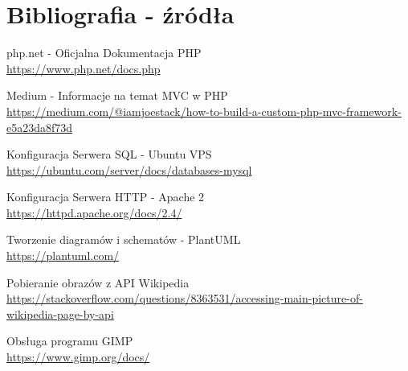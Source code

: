 
\section{Bibliografia - źródła }

\begin{thebibliography}{9}
    php.net - Oficjalna Dokumentacja PHP\\
    \url{https://www.php.net/docs.php}

    Medium - Informacje na temat MVC w PHP\\
    \url{https://medium.com/@iamjoestack/how-to-build-a-custom-php-mvc-framework-e5a23da8f73d}

    Konfiguracja Serwera SQL - Ubuntu VPS\\
    \url{https://ubuntu.com/server/docs/databases-mysql}


    Konfiguracja Serwera HTTP -  Apache 2\\
    \url{https://httpd.apache.org/docs/2.4/}

    Tworzenie diagramów i schematów - PlantUML\\
    \url{https://plantuml.com/}


    Pobieranie obrazów z API Wikipedia\\
    \url{https://stackoverflow.com/questions/8363531/accessing-main-picture-of-wikipedia-page-by-api}


    Obsługa programu GIMP\\
    \url{https://www.gimp.org/docs/}
    
  
\end{thebibliography}
